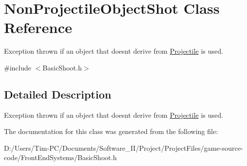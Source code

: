 \hypertarget{class_non_projectile_object_shot}{}\section{Non\+Projectile\+Object\+Shot Class Reference}
\label{class_non_projectile_object_shot}


Exception thrown if an object that doesnt derive from \hyperlink{class_projectile}{Projectile} is used.  




{\ttfamily \#include $<$Basic\+Shoot.\+h$>$}



\subsection{Detailed Description}
Exception thrown if an object that doesnt derive from \hyperlink{class_projectile}{Projectile} is used. 

The documentation for this class was generated from the following file\+:\begin{DoxyCompactItemize}
\item 
D\+:/\+Users/\+Tim-\/\+P\+C/\+Documents/\+Software\+\_\+\+I\+I/\+Project/\+Project\+Files/game-\/source-\/code/\+Front\+End\+Systems/Basic\+Shoot.\+h\end{DoxyCompactItemize}
